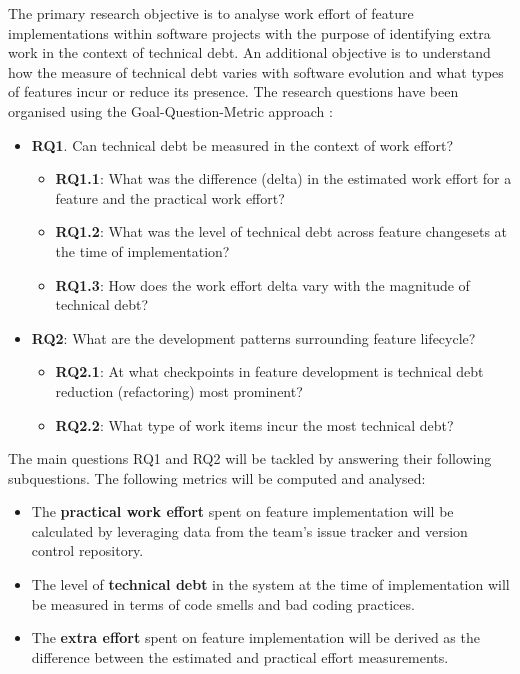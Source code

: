 \documentclass{mprop}
\begin{document}
The primary research objective is to analyse work effort of feature
implementations within software projects with the purpose of identifying extra
work in the context of technical debt. An additional objective is to understand
how the measure of technical debt varies with software evolution and what types
of features incur or reduce its presence. The research questions have been
organised using the Goal-Question-Metric approach \cite{VanSolingen2002}:
\begin{itemize}
	\item \textbf{RQ1}. Can technical debt be measured in the context of work
	effort?
	      \begin{itemize}
		      \item \textbf{RQ1.1}: What was the difference (delta) in the
		            estimated work effort for a feature and the practical work
		            effort?
			  \item \textbf{RQ1.2}: What was the level of technical debt across
		            feature changesets at the time of implementation?
		      \item \textbf{RQ1.3}: How does the work effort delta vary with the
		            magnitude of technical debt?
		  \end{itemize}
	\item \textbf{RQ2}: What are the development patterns surrounding feature
	      lifecycle?
	      \begin{itemize}
		      \item \textbf{RQ2.1}: At what checkpoints in feature development
		            is technical debt reduction (refactoring) most prominent?
		      \item \textbf{RQ2.2}: What type of work items incur the most
					technical debt?
	      \end{itemize}
\end{itemize}

The main questions RQ1 and RQ2 will be tackled by answering their following
subquestions. The following metrics will be computed and analysed:
\begin{itemize}
	\item The \textbf{practical work effort} spent on feature implementation
	will be calculated by leveraging data from the team's issue tracker and
	version control repository.
	\item The level of \textbf{technical debt} in the system at the time of
	implementation will be measured in terms of code smells and bad coding
	practices.
	\item The \textbf{extra effort} spent on feature implementation will be
	derived as the difference between the estimated and practical effort
	measurements. 
\end{itemize}
\end{document}
